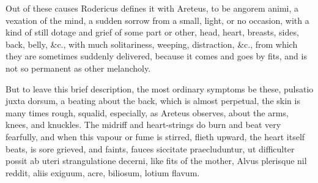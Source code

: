 {Out of these causes Rodericus defines it with Areteus, to be angorem
animi, a vexation of the mind, a sudden sorrow from a small, light, or
no occasion, with a kind of still dotage and grief of some part
or other, head, heart, breasts, sides, back, belly, \&c., with much
solitariness, weeping, distraction, \&c., from which they are sometimes
suddenly delivered, because it comes and goes by fits, and is not so
permanent as other melancholy.

But to leave this brief description, the most ordinary symptoms be
these, pulsatio juxta dorsum, a beating about the back, which is almost
perpetual, the skin is many times rough, squalid, especially, as
Areteus observes, about the arms, knees, and knuckles. The midriff and
heart-strings do burn and beat very fearfully, and when this vapour or
fume is stirred, flieth upward, the heart itself beats, is sore
grieved, and faints, fauces siccitate praecluduntur, ut difficulter
possit ab uteri strangulatione decerni, like fits of the mother, Alvus
plerisque nil reddit, aliis exiguum, acre, biliosum, lotium flavum.

}
